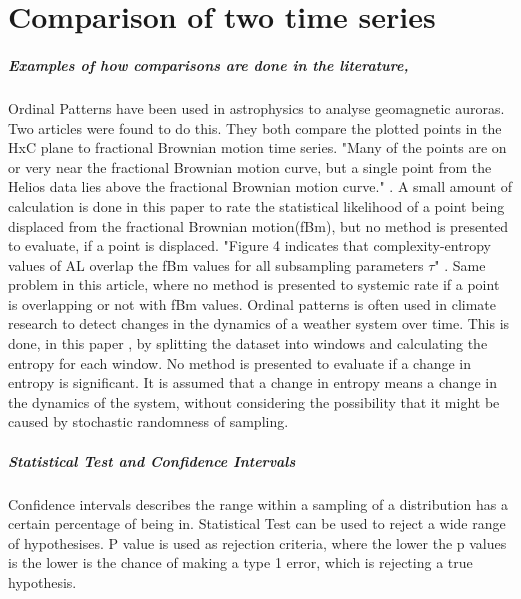 \chapter{Comparison of two time series}
\paragraph{Examples of how comparisons are done in the literature,}
Ordinal Patterns have been used in astrophysics to analyse geomagnetic auroras. Two articles were found to do this. They both compare the plotted points in the HxC plane to fractional Brownian motion time series. "Many of the points are on or very near the fractional Brownian motion curve, but a single point from the Helios data lies above the fractional Brownian motion curve." \cite{Weygand2019}. A small amount of calculation is done in this paper to rate the statistical likelihood of a point being displaced from the fractional Brownian motion(fBm), but no method is presented to evaluate, if a point is displaced. "Figure 4 indicates that complexity-entropy values of AL overlap the fBm values for all subsampling parameters $\tau$" \cite{Osmane2019}. Same problem in this article, where no method is presented to systemic rate if a point is overlapping or not with fBm values. Ordinal patterns is often used in climate research to detect changes in the dynamics of a weather system over time. This is done, in this paper \cite{Saco2010}, by splitting the dataset into windows and calculating the entropy for each window. No method is presented to evaluate if a change in entropy is significant. It is assumed that a change in entropy means a change in the dynamics of the system, without considering the possibility that it might be caused by stochastic randomness of sampling. 

\paragraph{Statistical Test and Confidence Intervals}
Confidence intervals describes the range within a sampling of a distribution has a certain percentage of being in. Statistical Test can be used to reject a wide range of hypothesises. P value is used as rejection criteria, where the lower the p values is the lower is the chance of making a type 1 error, which is rejecting a true hypothesis.\cite{Smithson2003}

